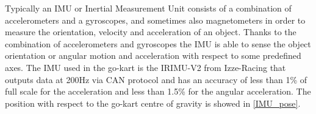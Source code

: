 \documentclass[a4paper,12pt,oneside]{book}
\begin{document}
Typically an IMU or Inertial Measurement Unit consists of a combination of accelerometers and a gyroscopes, and sometimes also magnetometers in order to measure the orientation, velocity and acceleration of an object.
Thanks to the combination of accelerometers and gyroscopes the IMU is able to sense the object orientation or angular motion and acceleration with respect to some predefined axes.
The IMU used in the go-kart is the IRIMU-V2 from Izze-Racing that outputs data at 200Hz via CAN protocol and has an accuracy of less than 1\% of full scale for the acceleration and less than 1.5\% for the angular acceleration.
The position with respect to the go-kart centre of gravity is showed in \ref{IMU_pose}.
	  
	





\printbibliography


\end{document}
